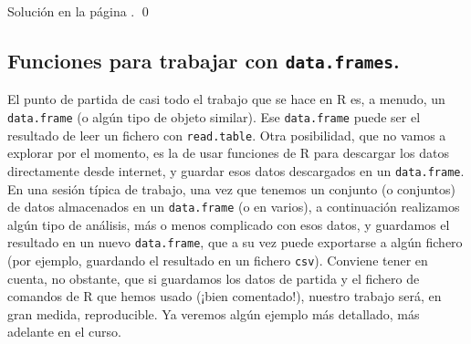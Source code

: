\documentclass[10pt,a4paper]{article}\usepackage[]{graphicx}\usepackage[]{color}
\makeatletter
\newcommand{\hlnum}[1]{\textcolor[rgb]{0.686,0.059,0.569}{#1}}%
\newcommand{\hlstr}[1]{\textcolor[rgb]{0.192,0.494,0.8}{#1}}%
\newcommand{\hlstd}[1]{\textcolor[rgb]{0.345,0.345,0.345}{#1}}%
\newcommand{\hlkwc}[1]{\textcolor[rgb]{0.333,0.667,0.333}{#1}}%
\newcommand{\hlkwd}[1]{\textcolor[rgb]{0.737,0.353,0.396}{\textbf{#1}}}%
\newenvironment{kframe}{%
 \def\at@end@of@kframe{}%
 \ifinner\ifhmode%
  \def\at@end@of@kframe{\end{minipage}}%
  \begin{minipage}{\columnwidth}%
 \fi\fi%
 \def\FrameCommand##1{\hskip\@totalleftmargin \hskip-\fboxsep
 \colorbox{shadecolor}{##1}\hskip-\fboxsep
     \hskip-\linewidth \hskip-\@totalleftmargin \hskip\columnwidth}%
 \MakeFramed {\advance\hsize-\width
   \@totalleftmargin\z@ \linewidth\hsize
   \@setminipage}}%
 {\par\unskip\endMakeFramed%
 \at@end@of@kframe}
\newenvironment{knitrout}{}{} %
\newcounter {cont01}
\makeatother
\begin{document}
\begin{ejercicio}
Solución en la página \pageref{tut04:ejercicio05:sol}.
\qed
\end{ejercicio}

\subsection{Funciones para trabajar con {\tt data.frames}.}

El punto de partida de casi todo el trabajo que se hace en R es, a menudo, un {\tt data.frame} (o algún tipo de objeto similar). Ese {\tt data.frame} puede ser el resultado de leer un fichero con {\tt read.table}. Otra posibilidad, que no vamos a explorar por el momento, es la de usar funciones de R para descargar los datos directamente desde internet, y guardar esos datos descargados en un {\tt data.frame}. En una sesión típica de trabajo, una vez que tenemos un conjunto (o conjuntos) de datos almacenados en un {\tt data.frame} (o en varios), a continuación realizamos algún tipo de análisis, más o menos complicado con esos datos, y guardamos el resultado en un nuevo {\tt data.frame}, que a su vez puede exportarse a algún fichero (por ejemplo, guardando el resultado en un fichero {\tt csv}). Conviene tener en cuenta, no obstante, que si guardamos los datos de partida y el fichero de comandos de R que hemos usado (¡bien comentado!), nuestro trabajo será, en gran medida, reproducible.  Ya veremos algún ejemplo más detallado, más adelante en el curso.
\end{document}
